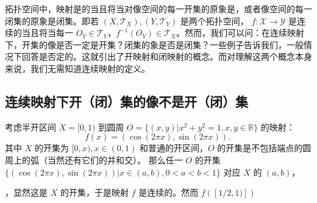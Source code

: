 
拓扑空间中，映射是的当且将当对像空间的每一开集的原象是，或者像空间的每一闭集的原象是闭集。即若 $(X,\mathcal T_X),(Y,\mathcal T_Y)$ 是两个拓扑空间， $f:\mathcal X\rightarrow\mathcal Y$ 是连续的当且将当每一 $O_Y\in\mathcal T_Y$，$f^{-1}(O_Y)\in\mathcal T_X$。然而，我们可以问：在连续映射下，开集的像是否一定是开集？闭集的象是否是闭集？一些例子告诉我们，一般情况下回答是否定的。这就引出了开映射和闭映射的概念。而对理解这两个概念本身来说，我们无需知道连续映射的定义。

\subsection{连续映射下开（闭）集的像不是开（闭）集}
\begin{example}{}
考虑半开区间 $X=[0,1)$ 到圆周 $O=\{(x,y)|x^2+y^2=1,x,y\in\mathbb R\}$ 的映射：
\begin{equation}
f(x)=(\cos(2\pi x),\sin(2\pi x)).~
\end{equation}
其中 $X$ 的开集为 $[0,x),x\in (0,1)$ 和普通的开区间，$O$ 的开集是不包括端点的圆周上的弧（当然还有它们的并和交）。
那么任一 $O$ 的开集 $\{(\cos(2\pi x),\sin(2\pi x))|x\in(a,b),0<a<b<1\}$ 对应 $X$ 的 $(a,b)$，
\end{example}，显然这是 $X$ 的开集，于是映射 $f$ 是连续的。然而 $f([1/2,1)])$



